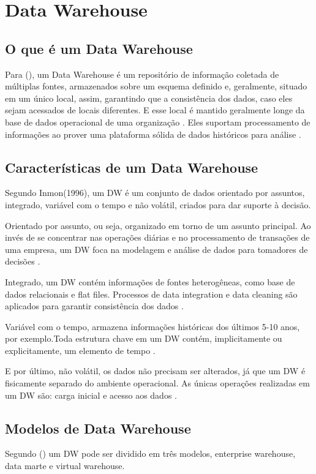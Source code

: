 \section{ Data Warehouse}
\subsection{O que é um Data Warehouse}
Para \citeauthor{jmj} (\citeyear[p.12]{jmj}), um Data Warehouse é um repositório de informação coletada de múltiplas fontes, armazenados sobre um esquema definido e, geralmente, situado em um único local, assim, garantindo que a consistência dos dados, caso eles sejam acessados de locais diferentes. E esse local é mantido geralmente longe da base de dados operacional de uma organização \citep[p. 126]{jmj}. Eles suportam processamento de informações ao prover uma plataforma sólida de dados históricos para análise \citep[p. 126]{jmj}.

\subsection{Características de um Data Warehouse}
Segundo Inmon(1996), um DW é um conjunto de dados orientado por assuntos, integrado, variável com o tempo e não volátil, criados para dar suporte à decisão.

Orientado por assunto, ou seja, organizado em torno de um assunto principal. Ao invés de se concentrar nas operações diárias e no processamento de transações de uma empresa, um DW foca na modelagem e análise de dados para tomadores de decisões \citep[p. 126]{jmj}.

Integrado, um DW contém informações de fontes heterogêneas, como base de dados relacionais e flat files. Processos de data integration e data cleaning são aplicados para garantir consistência dos dados \citep[p. 126]{jmj}.

Variável com o tempo, armazena informações históricas dos últimos 5-10 anos, por exemplo.Toda estrutura chave em um DW contém, implicitamente ou explicitamente, um elemento de tempo \citep[p. 127]{jmj}.

E por último, não volátil, os dados não precisam ser alterados, já que um DW é fisicamente separado do ambiente operacional. As únicas operações realizadas em um DW são: carga inicial e acesso aos dados \citep[p. 127]{jmj}.

\subsection{Modelos de Data Warehouse}
Segundo \citeauthor{jmj} (\citeyear[p. 132]{jmj}) um DW pode ser dividido em três modelos, enterprise warehouse, data marte e virtual warehouse.


